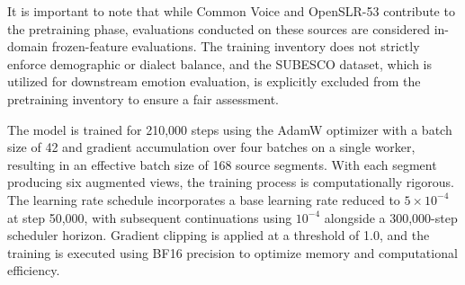 It is important to note that while Common Voice and OpenSLR-53 contribute to the pretraining phase, evaluations conducted on these sources are considered in-domain frozen-feature evaluations. The training inventory does not strictly enforce demographic or dialect balance, and the SUBESCO dataset, which is utilized for downstream emotion evaluation, is explicitly excluded from the pretraining inventory to ensure a fair assessment.

The model is trained for 210,000 steps using the AdamW optimizer with a batch size of 42 and gradient accumulation over four batches on a single worker, resulting in an effective batch size of 168 source segments. With each segment producing six augmented views, the training process is computationally rigorous. The learning rate schedule incorporates a base learning rate reduced to $5 \times 10^{-4}$ at step 50,000, with subsequent continuations using $10^{-4}$ alongside a 300,000-step scheduler horizon. Gradient clipping is applied at a threshold of 1.0, and the training is executed using BF16 precision to optimize memory and computational efficiency.